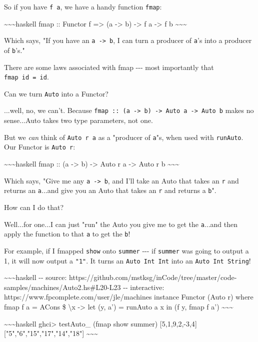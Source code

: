 \documentclass[]{article}
\begin{document}
So if you have \texttt{f\ a}, we have a handy function \texttt{fmap}:

\textasciitilde{}\textasciitilde{}\textasciitilde{}haskell fmap :: Functor f
=\textgreater{} (a -\textgreater{} b) -\textgreater{} f a -\textgreater{} f b
\textasciitilde{}\textasciitilde{}\textasciitilde{}

Which says, "If you have an \texttt{a\ -\textgreater{}\ b}, I can turn a
producer of \texttt{a}'s into a producer of \texttt{b}'s."

There are some laws associated with fmap -\/-\/- most importantly that
\texttt{fmap\ id\ =\ id}.

Can we turn \texttt{Auto} into a Functor?

...well, no, we can't. Because
\texttt{fmap\ ::\ (a\ -\textgreater{}\ b)\ -\textgreater{}\ Auto\ a\ -\textgreater{}\ Auto\ b}
makes no sense...Auto takes two type parameters, not one.

But we \emph{can} think of \texttt{Auto\ r\ a} as a "producer of \texttt{a}"s,
when used with \texttt{runAuto}. Our Functor is \texttt{Auto\ r}:

\textasciitilde{}\textasciitilde{}\textasciitilde{}haskell fmap :: (a
-\textgreater{} b) -\textgreater{} Auto r a -\textgreater{} Auto r b
\textasciitilde{}\textasciitilde{}\textasciitilde{}

Which says, "Give me any \texttt{a\ -\textgreater{}\ b}, and I'll take an Auto
that takes an \texttt{r} and returns an \texttt{a}...and give you an Auto that
takes an \texttt{r} and returns a \texttt{b}".

How can I do that?

Well...for one...I can just "run" the Auto you give me to get the
\texttt{a}...and then apply the function to that \texttt{a} to get the
\texttt{b}!

For example, if I fmapped \texttt{show} onto \texttt{summer} -\/-\/- if
\texttt{summer} was going to output a 1, it will now output a \texttt{"1"}. It
turns an \texttt{Auto\ Int\ Int} into an \texttt{Auto\ Int\ String}!

\textasciitilde{}\textasciitilde{}\textasciitilde{}haskell -\/- source:
https://github.com/mstksg/inCode/tree/master/code-samples/machines/Auto2.hs\#L20-L23
-\/- interactive: https://www.fpcomplete.com/user/jle/machines instance Functor
(Auto r) where fmap f a = ACons \$ \textbackslash{}x -\textgreater{} let (y, a')
= runAuto a x in (f y, fmap f a')
\textasciitilde{}\textasciitilde{}\textasciitilde{}

\textasciitilde{}\textasciitilde{}\textasciitilde{}haskell ghci\textgreater{}
testAuto\_ (fmap show summer) {[}5,1,9,2,-3,4{]}
{[}"5","6","15","17","14","18"{]}
\textasciitilde{}\textasciitilde{}\textasciitilde{}
\end{document}
